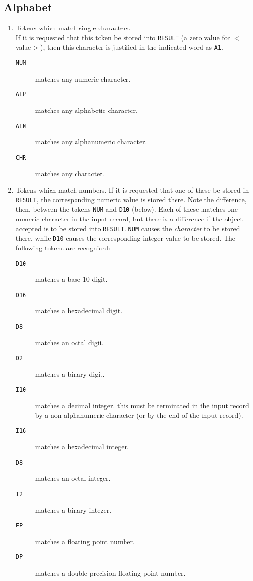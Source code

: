 \subsection{ Alphabet}
\begin{enumerate}
\item  Tokens which match single characters. \\
If it is requested that
this token be stored into {\tt RESULT} (a zero value for $<$value$>$), then this
character is justified in the indicated word as {\tt A1}.
\begin{description}
\item[{\tt NUM}]    matches any numeric character.
\item[{\tt ALP}]    matches any alphabetic character.
\item[{\tt ALN}]    matches any alphanumeric character.
\item[{\tt CHR}]    matches any character.
\end{description}
\item Tokens which match numbers. If it is requested that one of these be
stored in {\tt RESULT}, the corresponding numeric value is stored there.
Note the difference, then, between the tokens {\tt NUM} and {\tt D10} 
(below).
Each of these matches one numeric character in the input record, but
there is a difference if the object accepted is to be stored into
{\tt RESULT}. {\tt NUM} causes the {\em character} to be stored there, while 
{\tt D10}
causes the corresponding integer value to be stored. The following
tokens are recognised:
\begin{description}
\item[{\tt D10}]    matches a base 10 digit.
\item[{\tt D16}]    matches a hexadecimal digit.
\item[{\tt D8}]     matches an octal digit.
\item[{\tt D2}]     matches a binary digit.
\item[{\tt I10}]    matches a decimal integer. this must be terminated
in the input record by a non-alphanumeric character (or
by the end of the input record).
\item[{\tt I16}]    matches a hexadecimal integer.
\item[{\tt D8}]     matches an octal integer.
\item[{\tt I2}]     matches a binary integer.
\item[{\tt FP}]     matches a floating point number.
\item[{\tt DP}]     matches a double precision floating point number.

\end{description}
\end{enumerate}
